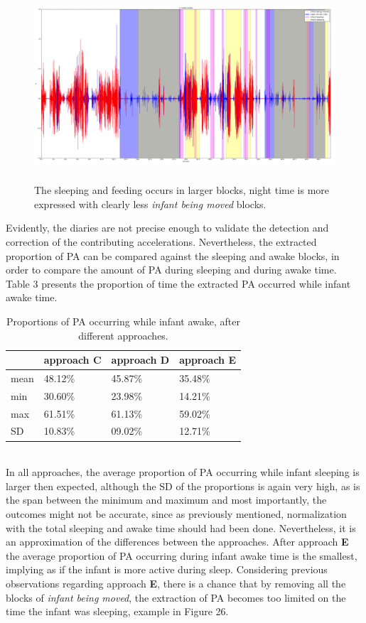 \documentclass{article}
\begin{document}
{\begin{figure}[h]
\includegraphics[width=15cm, height=7cm]{4moved.png}
\caption{The sleeping and feeding occurs in larger blocks, night time is more expressed with clearly less \textit{infant being moved} blocks.}
\end{figure}
Evidently, the diaries are not precise enough to validate the detection and correction of the contributing accelerations. Nevertheless, the extracted proportion of PA can be compared against the sleeping and awake blocks, in order to compare the amount of PA during sleeping and during awake time. Table 3 presents the proportion of time the extracted PA occurred while infant awake time.\\
\begin{table}[h]
\centering
\begin{tabular}{|l|l|l|l|}
\hline
     & approach C & approach D & approach E \\ \hline
mean & 48.12\%    & 45.87\%    & 35.48\%    \\ \hline
min  & 30.60\%    & 23.98\%    & 14.21\%    \\ \hline
max  & 61.51\%    & 61.13\%    & 59.02\%    \\ \hline
SD   & 10.83\%    & 09.02\%    & 12.71\%    \\ \hline
\end{tabular}
\caption{Proportions of PA occurring while infant awake, after different approaches.}
\end{table}
\\
In all approaches, the average proportion of PA occurring while infant sleeping is larger then expected, although the SD of the proportions is again very high, as is the span between the minimum and maximum and most importantly, the outcomes might not be accurate, since as previously mentioned, normalization with the total sleeping and awake time should had been done. Nevertheless, it is an approximation of the differences between the approaches. After approach \textbf{E} the average proportion of PA occurring during infant awake time is the smallest, implying as if the infant is more active during sleep. Considering previous observations regarding approach \textbf{E}, there is a chance that by removing all the blocks of \textit{infant being moved}, the extraction of PA becomes too limited on the time the infant was sleeping, example in Figure 26.
}
\end{document}
